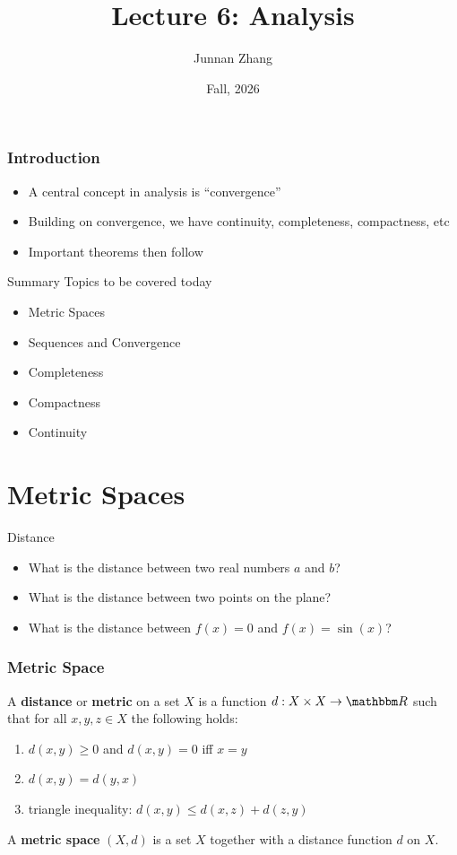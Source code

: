 \documentclass[9pt,aspectratio=169]{beamer}
\title[Lecture 6: Analysis]{Lecture 6: Analysis}
\author{Junnan Zhang} %
\institute[Paula and Gregory Chow Institute for Studies in Economics\\
Xiamen University] %
{
	Paula and Gregory Chow Institute for Studies in Economics \\ Xiamen University  \\ %
	\medskip
}
\date{Fall, 2026} %
\newcommand{\RR}{\mathbbm R}
\begin{document}
\begin{frame}
    \titlepage
\end{frame}

\begin{frame}
    \frametitle{Introduction}
    \begin{itemize}
        \item A central concept in analysis is ``convergence''
        \item Building on convergence, we have continuity, completeness,
        compactness, etc
        \item Important theorems then follow
    \end{itemize}
\end{frame}

\begin{frame}{Summary}
    Topics to be covered today
    \begin{itemize}
        \item Metric Spaces
        \item Sequences and Convergence
        \item Completeness
        \item Compactness
        \item Continuity
    \end{itemize}
\end{frame}

\section{Metric Spaces}

\begin{frame}{Distance}
    \begin{itemize}
        \item What is the distance between two real numbers $a$ and $b$?
        \item What is the distance between two points on the plane? 
        \item What is the distance between $f(x) = 0$ and $f(x) = \sin(x)$?
    \end{itemize}
\end{frame}

\begin{frame}
    \frametitle{Metric Space}
    \begin{definition}
        A \textbf{distance} or \textbf{metric} on a set $X$ is a function $d: X
        \times X \to \RR$ such that for all $x, y, z \in X$ the following
        holds:
        \begin{enumerate}
            \item $d(x, y) \geq 0$ and $d(x, y) = 0$ iff $x = y$
            \item $d(x, y) = d(y, x)$
            \item triangle inequality: $d(x, y) \leq d(x, z) + d(z, y)$
        \end{enumerate}
        A \textbf{metric space} $(X, d)$ is a set $X$ together with a distance
        function $d$ on $X$.
    \end{definition}
\end{frame}
\end{document}
